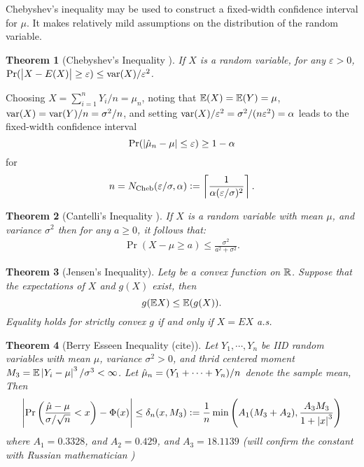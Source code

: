 \documentclass{iitthesis}
\newtheorem{theorem}{Theorem}[section]
\begin{document}
Chebyshev's inequality may be used to construct a fixed-width confidence interval for $\mu$.  It makes relatively mild assumptions on the distribution of the random variable.

\begin{theorem}[Chebyshev's Inequality {\cite[6.1.c]{LB10}}] \label{ChebyThm}If $X$ is a random variable, for any $\varepsilon>0$, $\Pr(\left \lvert X-E(X) \right \rvert \ge \varepsilon) \le  \operatorname{var}(X)/\varepsilon^2$.
\end{theorem}
Choosing $X=\sum_{i=1}^n Y_i/n = \mu_n $, noting that $\mathbb{E}(X) = \mathbb{E}(Y) = \mu$, $\operatorname{var}(X) = \operatorname{var}(Y)/n = \sigma^2/n$, and setting $\operatorname{var}(X)/\varepsilon^2=\sigma^2/(n\varepsilon^2) = \alpha$ leads to the fixed-width confidence interval 
\[
\Pr(\left \lvert \hat{\mu}_{n}-\mu \right \rvert \le \varepsilon) \ge 1- \alpha 
\]
 for 
 \begin{align}
n=N_{\text{Cheb}}(\varepsilon/\sigma,\alpha):= \left \lceil \frac{1}{\alpha (\varepsilon/\sigma)^2} \right \rceil.
 \end{align}
\begin{theorem}[Cantelli's Inequality {\cite[6.1.e]{LB10}}]\label{CanThm} If $X$ is a random variable with mean $\mu$, and variance $\sigma^2$ then for any $a \geq 0$, it follows that: 
\begin{align}
\Pr(X-\mu \ge a) \le  \frac{\sigma^2}{a^2+\sigma^2}.
\end{align}
\end{theorem}
\begin{theorem}[Jensen's Inequality{\cite[8.4a]{LB10}}]\label{Jensen}
Let$g$ be a convex function on $\mathbb{R}$. Suppose that the expectations of $X$ and $g(X)$ exist, then
$$g(\mathbb{E} X) \leq \mathbb{E}(g(X)).$$
Equality holds for strictly convex $g$ if and only if $X=EX$ a.s.

\end{theorem}
\begin{theorem}[Berry Esseen Inequality (cite)] \label{BEThm}
Let $Y_1,\cdots,Y_n$ be IID random variables with mean $\mu$, variance $\sigma^2 >0$, and thrid centered moment $M_3 = \mathbb{E}\left \lvert Y_i-\mu \right \rvert^3/\sigma^3 < \infty$. Let $\hat{\mu}_n = (Y_1+\cdots+Y_n)/n$ denote the sample mean, Then
\[
\left \lvert \Pr\left(\frac{\hat{\mu}-\mu}{\sigma/\sqrt{n}}<x\right)-\Phi(x) \right \rvert \leq \delta_n(x,M_3):=\frac{1}{n}\min\left( A_1(M_3+A_2), \frac{A_3M_3}{1+\left \lvert x \right \rvert^3}\right)
\]
where $A_1 = 0.3328$, and $A_2 = 0.429$, and $A_3=18.1139$ (will confirm the constant with Russian mathematician )
\end{theorem}
\end{document}
